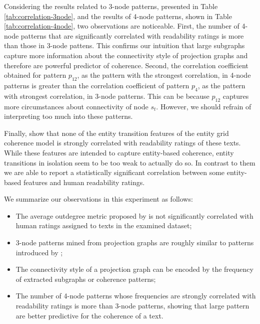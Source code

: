Considering the results related to 3-node patterns, presented in Table \ref{tab:correlation-3node}, and the results of 4-node patterns, shown in Table \ref{tab:correlation-4node}, two observations are noticeable.
First, the number of 4-node patterns that are significantly correlated with readability ratings is more than those in 3-node pattens. 
This confirms our intuition that large subgraphs capture more information about the connectivity style of projection graphs and therefore are powerful predictor of coherence.  
Second, the correlation coefficient obtained for pattern $p_{12}$, as the pattern with the strongest correlation, in 4-node patterns is greater than the correlation coefficient of pattern $p_4$, as the pattern with strongest correlation, in 3-node patterns. 
This can be because $p_{12}$ captures more circumstances about connectivity of node $s_t$. 
However, we should refrain of interpreting too much into these patterns. 

Finally,  show that none of the entity transition features of the entity grid coherence model is strongly correlated with readability ratings of these texts. 
While these features are intended to capture entity-based coherence, entity transitions in isolation seem to be too weak to actually do so. 
In contrast to them we are able to report a statistically significant correlation between some entity-based features and human readability ratings.

We summarize our observations in this experiment as follows: 

\begin{itemize}

	\item The average outdegree metric proposed by  is not significantly correlated with human ratings assigned to texts in the examined dataset;

	\item 3-node patterns mined from projection graphs are roughly similar to patterns introduced by ;

	\item The connectivity style of a projection graph can be encoded by the frequency of extracted subgraphs or coherence patterns; 

	\item The number of 4-node patterns whose frequencies are strongly correlated with readability ratings is more than 3-node patterns, showing that large pattern are better predictive for the coherence of a text.

\end{itemize}


